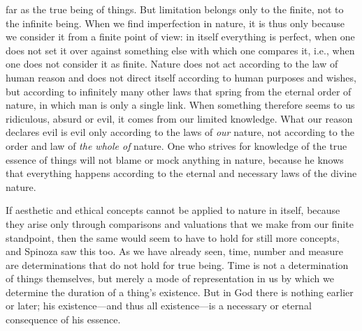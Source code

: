 \documentclass[12pt]{book}
\newcommand{\opage}[1]{\marginnote{\footnotesize\textit{[#1]}}}
\begin{document}
far as the true being of things. But limitation belongs only to the finite, not to the
infinite being. When we find imperfection in nature, it is thus only because we
consider it from a finite point of view: in itself everything is perfect, when one does
not set it over against something else with which one compares it, i.e., when one does
not consider it as finite. Nature does not act according to the law of human reason and
does not direct itself according to human purposes and wishes, but according to
infinitely many other laws that spring from the eternal order of nature, in which man is
only a single link. When something therefore seems to us ridiculous, absurd or evil, it
comes from our limited knowledge. What our reason declares evil is evil only according
to the laws of \emph{our} nature, not according to the order and law of \emph{the whole
of} nature. One who strives for knowledge of the true essence of things will not blame
or mock anything in nature, because he knows that everything happens according to the
eternal and necessary laws of the divine nature.

If aesthetic and ethical concepts cannot be applied to nature in itself, because they
arise only through comparisons and valuations that we make from our finite standpoint,
then the same would seem to have to hold \opage{118}for still more concepts, and Spinoza
saw this too. As we have already seen, time, number and measure are determinations that
do not hold for true being. Time is not a determination of things themselves, but merely
a mode of representation in us by which we determine the duration of a thing's
existence. But in God there is nothing earlier or later; his existence---and thus all
existence---is a necessary or eternal consequence of his essence.
\end{document}
